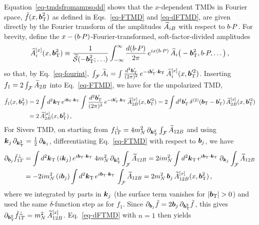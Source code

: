 Equation~\eqref{eq-tmdsfromampsodd} shows that the $x$-dependent TMDs in Fourier space, $\tilde f(x,\boldsymbol{b}_{\mathrm T}^2)$ as defined in Eqs.~\eqref{eq-FTMD} and \eqref{eq-dFTMD}, are given directly by the Fourier transform of the amplitudes $\widetilde{A}_{iB}$ with respect to $b {\cdot} P$.
For brevity, define the $x-(b{\cdot} P)$-Fourier-transformed, soft-factor-divided amplitudes
\begin{equation}
	\widetilde{A}^{[x]}_i(x,\boldsymbol{b}_{\mathrm T}^2) \equiv \frac{1}{\widetilde{\mathcal{S}}(-\boldsymbol{b}_{\mathrm T}^2;\ldots)} \int_{-\infty}^{\infty} \frac{d(b {\cdot} P)}{2\pi}\, e^{ix(b {\cdot} P)}\, \widetilde{A}_{i}\big(-\boldsymbol{b}_{\mathrm T}^2,b {\cdot} P,\ldots\big)\,,
\end{equation}
so that, by Eq.~\eqref{eq-fourint}, $\int_\mathcal{F} \widetilde{A}_i = \int \frac{d^2 \boldsymbol{b}_{\mathrm T}'}{(2\pi)^2}\, e^{-i\boldsymbol{b}_{\mathrm T}'{\cdot}\boldsymbol{k}_{\mathrm T}}\, \widetilde{A}^{[x]}_i(x,\boldsymbol{b}_{\mathrm T}'^2)$. Inserting $f_1 = 2\int_\mathcal{F}\widetilde{A}_{2B}$ into Eq.~\eqref{eq-FTMD}, we have for the unpolarized TMD,
\begin{align}
	\tilde f_1(x,\boldsymbol{b}_{\mathrm T}^2) 
	&= 2 \int d^2\boldsymbol{k}_{\mathrm T}\, e^{i\boldsymbol{b}_{\mathrm T}{\cdot}\boldsymbol{k}_{\mathrm T}} \int \frac{d^2 \boldsymbol{b}_{\mathrm T}'}{(2\pi)^2}\, e^{-i\boldsymbol{b}_{\mathrm T}'{\cdot}\boldsymbol{k}_{\mathrm T}}\, \widetilde{A}^{[x]}_{2B}(x,\boldsymbol{b}_{\mathrm T}'^2) 
	= 2 \int d^2 \boldsymbol{b}_{\mathrm T}'\, \delta^{(2)}(\boldsymbol{b}_{\mathrm T}-\boldsymbol{b}_{\mathrm T}')\, \widetilde{A}^{[x]}_{2B}(x,\boldsymbol{b}_{\mathrm T}'^2) \nonumber\\
	&= 2\, \widetilde{A}^{[x]}_{2B}(x,\boldsymbol{b}_{\mathrm T}^2)\,,
\end{align}
For Sivers TMD, on starting from $f_{1T}^\perp = 4m_N^2\,\partial_{\boldsymbol{k}_{\mathrm T}^2}\int_\mathcal{F}\widetilde{A}_{12B}$ and using $\boldsymbol{k}_j\,\partial_{\boldsymbol{k}_{\mathrm T}^2} = \tfrac12\,\partial_{\boldsymbol{k}_j}$, differentiating Eq.~\eqref{eq-FTMD} with respect to $\boldsymbol{b}_j$, we have
\begin{align}
	\partial_{\boldsymbol{b}_j}\tilde f_{1T}^\perp 
	&= \int d^2\boldsymbol{k}_{\mathrm T}\,(i\boldsymbol{k}_j)\,e^{i\boldsymbol{b}_{\mathrm T}{\cdot}\boldsymbol{k}_{\mathrm T}}\; 4m_N^2\,\partial_{\boldsymbol{k}_{\mathrm T}^2}\int_\mathcal{F}\widetilde{A}_{12B}
	 = 2im_N^2 \int d^2\boldsymbol{k}_{\mathrm T}\, e^{i\boldsymbol{b}_{\mathrm T}{\cdot}\boldsymbol{k}_{\mathrm T}}\;\partial_{\boldsymbol{k}_j}\int_\mathcal{F}\widetilde{A}_{12B} \nonumber\\
	&= -2im_N^2\,(i\boldsymbol{b}_j) \int d^2\boldsymbol{k}_{\mathrm T}\, e^{i\boldsymbol{b}_{\mathrm T}{\cdot}\boldsymbol{k}_{\mathrm T}}\,\int_\mathcal{F}\widetilde{A}_{12B}
	 = 2m_N^2\,\boldsymbol{b}_j\,\widetilde{A}^{[x]}_{12B}(x,\boldsymbol{b}_{\mathrm T}^2)\,,
\end{align}
where we integrated by parts in $\boldsymbol{k}_j$ (the surface term vanishes for $|\vprp{\bvec}|>0$) and used the same $\delta$-function step as for $f_1$. Since $\partial_{\boldsymbol{b}_j}\tilde f = 2\boldsymbol{b}_j\,\partial_{\boldsymbol{b}_{\mathrm T}^2}\tilde f$, this gives $\partial_{\boldsymbol{b}_{\mathrm T}^2}\tilde f_{1T}^\perp = m_N^2\,\widetilde{A}^{[x]}_{12B}$. Eq.~\eqref{eq-dFTMD} with $n=1$ then yields
